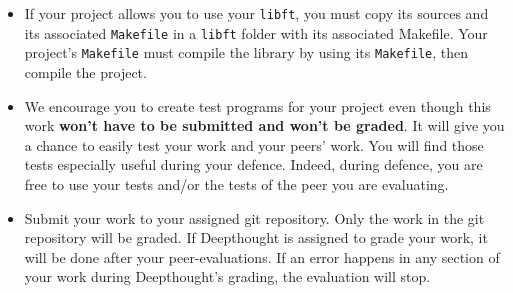 \begin{itemize}
      \item If your project allows you to use your \texttt{libft}, you must copy its sources
        and its associated \texttt{Makefile} in a \texttt{libft} folder with its associated
        Makefile. Your project's \texttt{Makefile} must compile the library by using its
        \texttt{Makefile}, then compile the project.

      \item We encourage you to create test programs for your
        project even though this work \textbf{won't have to be
          submitted and won't be graded}. It will give you a chance
        to easily test your work and your peers’ work. You will find
        those tests especially useful during your defence. Indeed,
        during defence, you are free to use your tests and/or the
        tests of the peer you are evaluating.

      \item Submit your work to your assigned git repository. Only the work in the
        git repository will be graded. If Deepthought is assigned to grade your
        work, it will be done after your peer-evaluations.
        If an error happens in any section of your work during Deepthought's grading,
        the evaluation will stop.
    \end{itemize}

